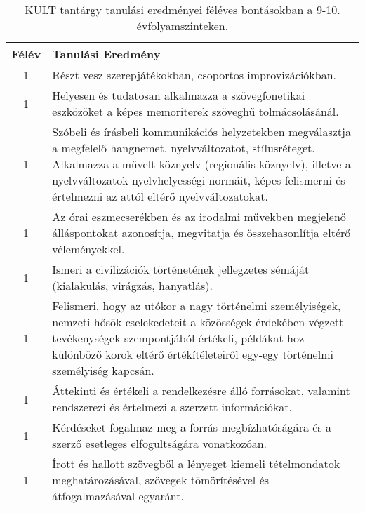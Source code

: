        
           \begin{longtable}{c | p{12cm} }
            \caption[KULT 9-10.]{KULT tantárgy tanulási eredményei féléves bontásokban a 9-10. évfolyamszinteken. }  \\

            \textbf{Félév} & \textbf{Tanulási Eredmény} \\
            \hline
            \endhead
                                
                                      
                                
                                          1 &  Részt vesz szerepjátékokban, csoportos improvizációkban. \\ \hline
                                          1 &  Helyesen és tudatosan alkalmazza a szövegfonetikai eszközöket a képes memoriterek szöveghű tolmácsolásánál. \\ \hline
                                          1 &  Szóbeli és írásbeli kommunikációs helyzetekben megválasztja a megfelelő hangnemet, nyelvváltozatot, stílusréteget. Alkalmazza a művelt köznyelv (regionális köznyelv), illetve a nyelvváltozatok nyelvhelyességi normáit, képes felismerni és értelmezni az attól eltérő nyelvváltozatokat. \\ \hline
                                          1 &  Az órai eszmecserékben és az irodalmi művekben megjelenő álláspontokat azonosítja, megvitatja és összehasonlítja eltérő véleményekkel. \\ \hline
                                          1 &  Ismeri a civilizációk történetének jellegzetes sémáját (kialakulás, virágzás, hanyatlás). \\ \hline
                                          1 &  Felismeri, hogy az utókor a nagy történelmi személyiségek, nemzeti hősök cselekedeteit a közösségek érdekében végzett tevékenységek szempontjából értékeli, példákat hoz különböző korok eltérő értékítéleteiről egy-egy történelmi személyiség kapcsán. \\ \hline
                                          1 &  Áttekinti és értékeli a rendelkezésre álló forrásokat, valamint rendszerezi és értelmezi a szerzett információkat. \\ \hline
                                          1 &  Kérdéseket fogalmaz meg a forrás megbízhatóságára és a szerző esetleges elfogultságára vonatkozóan. \\ \hline
                                          1 &  Írott és hallott szövegből a lényeget kiemeli tételmondatok meghatározásával, szövegek tömörítésével és átfogalmazásával egyaránt. \\ \hline

\end{longtable}
